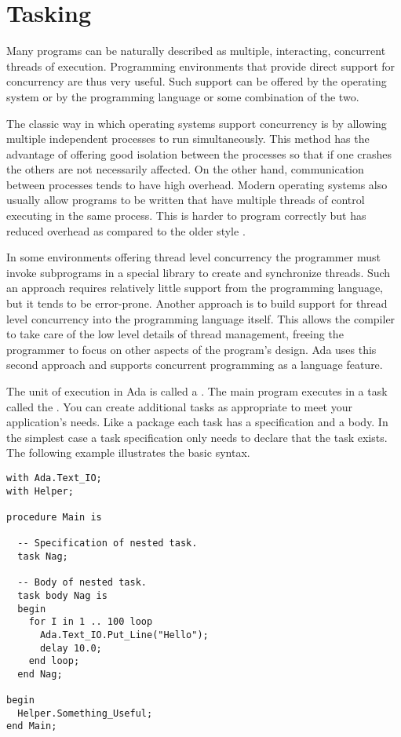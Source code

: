 \section{Tasking}

Many programs can be naturally described as multiple, interacting, concurrent threads of
execution. Programming environments that provide direct support for concurrency are thus very
useful. Such support can be offered by the operating system or by the programming language or
some combination of the two.

The classic way in which operating systems support concurrency is by allowing multiple
independent processes to run simultaneously. This method has the advantage of offering good
isolation between the processes so that if one crashes the others are not necessarily affected.
On the other hand, communication between processes tends to have high overhead. Modern operating
systems also usually allow programs to be written that have multiple threads of control
executing in the same process. This  is harder to program
correctly but has reduced overhead as compared to the older style .

In some environments offering thread level concurrency the programmer must invoke subprograms in
a special library to create and synchronize threads. Such an approach requires relatively little
support from the programming language, but it tends to be error-prone. Another approach is to
build support for thread level concurrency into the programming language itself. This allows the
compiler to take care of the low level details of thread management, freeing the programmer to
focus on other aspects of the program's design. Ada uses this second approach and supports
concurrent programming as a language feature.

The unit of execution in Ada is called a . The main program executes in a task
called the . You can create additional tasks as appropriate to meet
your application's needs. Like a package each task has a specification and a body. In the
simplest case a task specification only needs to declare that the task exists. The following
example illustrates the basic syntax.

\begin{lstlisting}
with Ada.Text_IO;
with Helper;

procedure Main is

  -- Specification of nested task.
  task Nag;

  -- Body of nested task.
  task body Nag is
  begin
    for I in 1 .. 100 loop
      Ada.Text_IO.Put_Line("Hello");
      delay 10.0;
    end loop;
  end Nag;

begin
  Helper.Something_Useful;
end Main;
\end{lstlisting}

